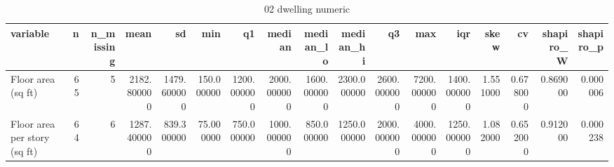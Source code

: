\begin{table}
\caption{02 dwelling numeric}
\label{tab:02_dwelling_numeric}
\begin{tabular}{lrrrrrrrrrrrrrrrr}
\toprule
variable & n & n\_missing & mean & sd & min & q1 & median & median\_lo & median\_hi & q3 & max & iqr & skew & cv & shapiro\_W & shapiro\_p \\
\midrule
Floor area (sq ft) & 65 & 5 & 2182.800000 & 1479.600000 & 150.000000 & 1200.000000 & 2000.000000 & 1600.000000 & 2300.000000 & 2600.000000 & 7200.000000 & 1400.000000 & 1.551000 & 0.678000 & 0.869000 & 0.000006 \\
Floor area per story (sq ft) & 64 & 6 & 1287.400000 & 839.300000 & 75.000000 & 750.000000 & 1000.000000 & 850.000000 & 1250.000000 & 2000.000000 & 4000.000000 & 1250.000000 & 1.082000 & 0.652000 & 0.912000 & 0.000238 \\
\bottomrule
\end{tabular}
\end{table}
